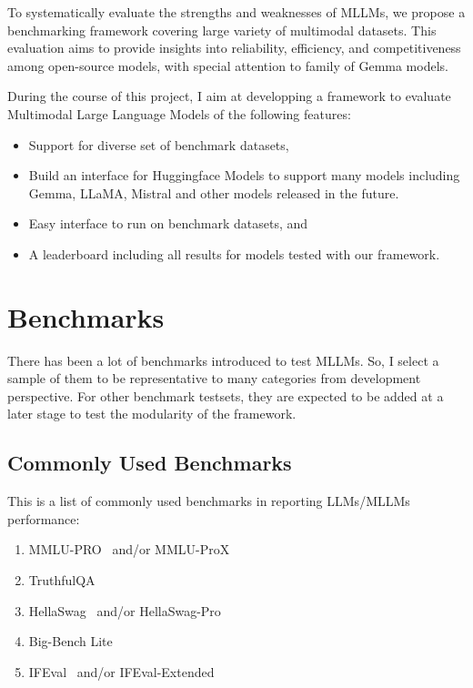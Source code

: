 \documentclass[
	letterpaper, %
]{jdf}
\begin{document}
To systematically evaluate the strengths and weaknesses of MLLMs, we propose a benchmarking framework covering large variety of multimodal datasets.
This evaluation aims to provide insights into reliability, efficiency, and competitiveness among open-source models, with special attention to family of Gemma models.

During the course of this project, I aim at developping a framework to evaluate Multimodal Large Language Models of the following features:
     \begin{itemize}
              \item Support for diverse set of benchmark datasets,
              \item Build an interface for Huggingface Models to support many models including Gemma, LLaMA, Mistral and other models released in the future.
              \item Easy interface to run on benchmark datasets, and
              \item A leaderboard including all results for models tested with our framework.
                   \end{itemize}

\section{Benchmarks}\label{sect:benchmarks}
There has been a lot of benchmarks introduced to test MLLMs.
So, I select a sample of them to be representative to many categories from development perspective.
For other benchmark testsets, they are expected to be added at a later stage to test the modularity of the framework.
\subsection{Commonly Used Benchmarks}\label{ssect:common}
This is a list of commonly used benchmarks in reporting LLMs/MLLMs performance:
\begin{enumerate}
    \item MMLU-PRO~\cite{wang2024mmlu} and/or MMLU-ProX~\cite{xuan2025mmlu}
    \item TruthfulQA\cite{lin2021truthfulqa}
    \item HellaSwag~\cite{zellers2019hellaswag} and/or HellaSwag-Pro~\cite{li2025hellaswag}
    \item Big-Bench Lite~\cite{srivastava2023beyond}
    \item IFEval~\cite{zhou2023instruction} and/or IFEval-Extended~\cite{kovalevskyi2024ifeval}
              \end{enumerate}
\end{document}
